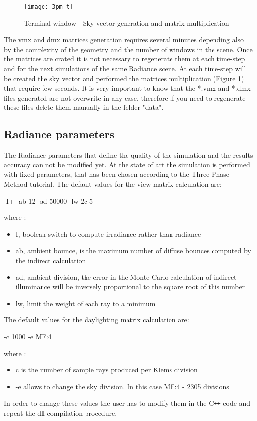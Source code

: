 \begin{figure}[H]
\centering
\texttt{[image: 3pm\_t]}
\caption{\label{img5:3pm} Terminal window - Sky vector generation and matrix multiplication }
\end{figure}

The vmx and dmx matrices generation requires several minutes depending also by the complexity of the geometry and the number of windows in the scene. Once the matrices are crated it is not necessary to regenerate them at each time-step and for the next simulations of the same Radiance scene. At each time-step will be created the sky vector and performed the matrices multiplication (Figure \ref{img5:3pm}) that require few seconds.
It is very important to know that the *.vmx and *.dmx files generated are not overwrite in any case, therefore if you need to regenerate these files delete them manually in the folder "data".\\

\subsection{Radiance parameters}
The Radiance parameters that define the quality of the simulation and the results accuracy can not be modified yet. At the state of art the simulation is performed with fixed parameters, that has been chosen according to the Three-Phase Method tutorial. The default values for the view matrix calculation are:

\begin{center}
-I+ -ab 12 -ad 50000 -lw 2e-5
\end{center}

where \cite{rad_tut}:
\begin{itemize}
\renewcommand{\labelitemi}{\tiny$\blacksquare$}
\item I, boolean switch to compute irradiance rather than radiance
\item ab, ambient bounce, is the maximum number of diffuse bounces computed by the indirect calculation
\item ad, ambient division, the error in the Monte Carlo calculation of indirect illuminance will be inversely proportional to the square root of this number
\item lw, limit the weight of each ray to a minimum
\end{itemize}

The default values for the daylighting matrix calculation are: 
\begin{center}
-c 1000 -e MF:4
\end{center}
where \cite{3ph_tut}: 
\begin{itemize}
\renewcommand{\labelitemi}{\tiny$\blacksquare$}
\item c is the number of sample rays produced per Klems division
\item -e allows to change the sky division. In this case MF:4 - 2305 divisions
\end{itemize}

In order to change these values the user has to modify them in the C\texttt{++} code and repeat the dll compilation procedure.